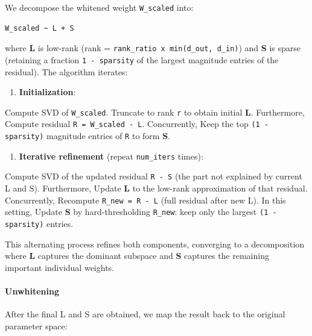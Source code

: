 We decompose the whitened weight \texttt{W\_scaled} into:

\vspace{0.5em}
\begin{mdframed}[backgroundcolor=codebg, linecolor=codeframe, linewidth=1pt, roundcorner=4pt, innerleftmargin=2pt, innerrightmargin=5pt, innertopmargin=5pt, innerbottommargin=5pt]
\begin{lstlisting}
W_scaled ~ L + S
\end{lstlisting}
\end{mdframed}
\vspace{0.5em}

where \textbf{L} is low-rank (rank = \texttt{rank\_ratio x min(d\_out, d\_in)}) and \textbf{S} is sparse (retaining a fraction \texttt{1 - sparsity} of the largest magnitude entries of the residual). The algorithm iterates:

\begin{enumerate}
\item \textbf{Initialization}:  
\end{enumerate}
Compute SVD of \texttt{W\_scaled}. Truncate to rank \texttt{r} to obtain initial \textbf{L}. Furthermore, Compute residual \texttt{R = W\_scaled - L}. Concurrently, Keep the top \texttt{(1 - sparsity)} magnitude entries of \texttt{R} to form \textbf{S}.


\begin{enumerate}
\item \textbf{Iterative refinement} (repeat \texttt{num\_iters} times):  
\end{enumerate}
Compute SVD of the updated residual \texttt{R - S} (the part not explained by current L and S). Furthermore, Update \textbf{L} to the low-rank approximation of that residual. Concurrently, Recompute \texttt{R\_new = R - L} (full residual after new L). In this setting, Update \textbf{S} by hard-thresholding \texttt{R\_new}: keep only the largest \texttt{(1 - sparsity)} entries.


This alternating process refines both components, converging to a decomposition where \textbf{L} captures the dominant subspace and \textbf{S} captures the remaining important individual weights.

\paragraph{Unwhitening}

After the final L and S are obtained, we map the result back to the original parameter space:

